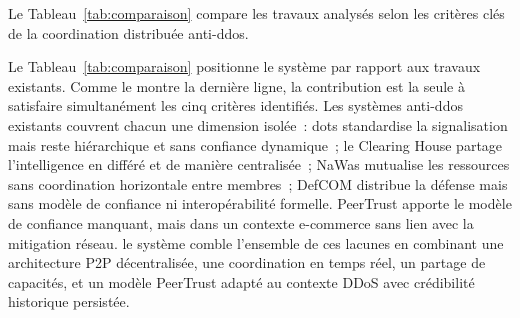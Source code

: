 Le Tableau~\ref{tab:comparaison} compare les travaux analysés selon les critères clés de la coordination distribuée anti-\gls{ddos}.


\begin{table}[H]
\centering
\renewcommand{\arraystretch}{2.0}
\setlength{\tabcolsep}{8pt}
\caption{Comparaison des systèmes existants et positionnement de la contribution.}
\label{tab:comparaison}
\end{table}

Le Tableau~\ref{tab:comparaison} positionne le système par rapport aux travaux existants. Comme le montre la dernière ligne, la contribution est la seule à satisfaire simultanément les cinq critères identifiés. Les systèmes anti-\gls{ddos} existants couvrent chacun une dimension isolée~: \gls{dots} standardise la signalisation mais reste hiérarchique et sans confiance dynamique~; le Clearing House partage l'intelligence en différé et de manière centralisée~; NaWas mutualise les ressources sans coordination horizontale entre membres~; DefCOM distribue la défense mais sans modèle de confiance ni interopérabilité formelle. PeerTrust apporte le modèle de confiance manquant, mais dans un contexte e-commerce sans lien avec la mitigation réseau. le système comble l'ensemble de ces lacunes en combinant une architecture P2P décentralisée, une coordination en temps réel, un partage de capacités, et un modèle PeerTrust adapté au contexte DDoS avec crédibilité historique persistée.

